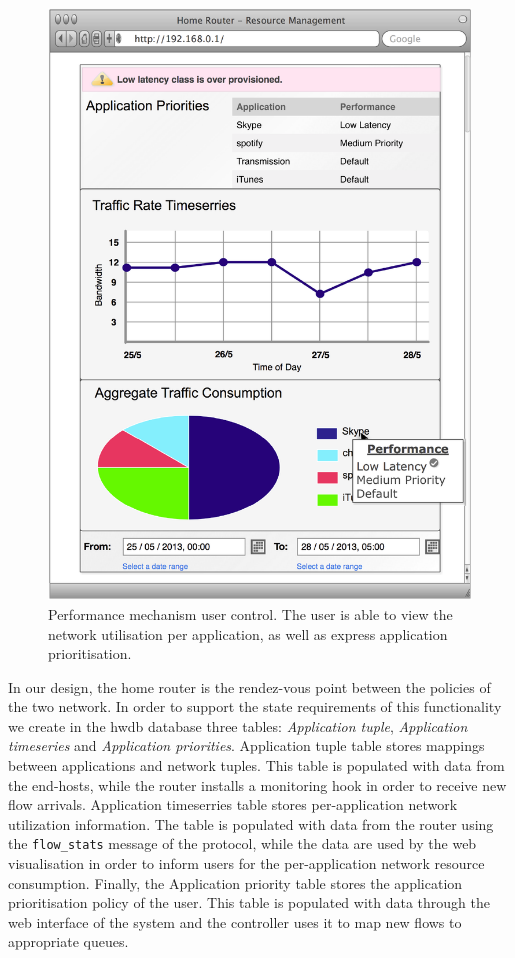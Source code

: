 \begin{figure}
  \centering
  \includegraphics[width=0.8\columnwidth]{homework_intf_qos}
  \caption{\label{fig:homework_intf_qos} Performance mechanism  user control.
    The user is able to view the network utilisation per application, as well as
    express application prioritisation.}
\end{figure}

In our design, the home router is the rendez-vous point between the
policies of the two network. In order to support the state requirements of this
functionality we create in the hwdb database three tables: {\it Application
  tuple}, {\it Application timeseries} and {\it Application priorities}.
Application tuple table stores mappings between applications and 
network tuples. This table is populated with data from the end-hosts, while the
router installs a monitoring hook in order to receive new flow arrivals.
Application timeserries table stores per-application network utilization
information. The table is populated with data from the router using the
\texttt{flow\_stats} message of the \of protocol, while the data are used by the web
visualisation in order to inform users for the per-application network resource 
consumption. 
Finally, the Application priority table stores the application prioritisation
policy of the user. This table is populated with data through the web interface
of the system and the controller uses it to map new flows to  appropriate
queues.

